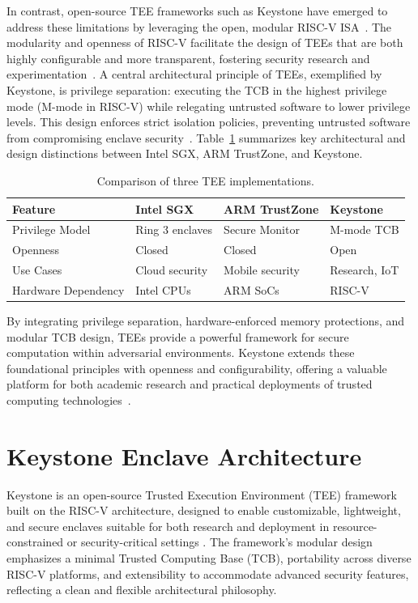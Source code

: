 In contrast, open-source TEE frameworks such as Keystone have emerged to address these limitations by leveraging the open, modular RISC-V ISA~\cite{Lee2019}. The modularity and openness of RISC-V facilitate the design of TEEs that are both highly configurable and more transparent, fostering security research and experimentation~\cite{Survey2023}. A central architectural principle of TEEs, exemplified by Keystone, is privilege separation: executing the TCB in the highest privilege mode (M-mode in RISC-V) while relegating untrusted software to lower privilege levels. This design enforces strict isolation policies, preventing untrusted software from compromising enclave security~\cite{Lee2019}.
Table~\ref{tab:tee-comparison} summarizes key architectural and design distinctions between Intel SGX, ARM TrustZone, and Keystone.

\begin{table}[htbp]
\centering
\caption{Comparison of three TEE implementations.}
\label{tab:tee-comparison}
\small
\begin{tabular}{@{}p{3cm}p{2.5cm}p{2.5cm}p{2.5cm}@{}}
\toprule
\textbf{Feature} & \textbf{Intel SGX} & \textbf{ARM TrustZone} & \textbf{Keystone} \\
\midrule
Privilege Model & Ring 3 enclaves & Secure Monitor & M-mode TCB \\
Openness & Closed & Closed & Open \\
Use Cases & Cloud security & Mobile security & Research, IoT \\
Hardware Dependency & Intel CPUs & ARM SoCs & RISC-V \\
\bottomrule
\end{tabular}
\end{table}


By integrating privilege separation, hardware-enforced memory protections, and modular TCB design, TEEs provide a powerful framework for secure computation within adversarial environments. Keystone extends these foundational principles with openness and configurability, offering a valuable platform for both academic research and practical deployments of trusted computing technologies~\cite{suzaki2021tsperf}.


\section{Keystone Enclave Architecture}

Keystone is an open-source Trusted Execution Environment (TEE) framework built on the RISC-V architecture, designed to enable customizable, lightweight, and secure enclaves suitable for both research and deployment in resource-constrained or security-critical settings \cite{Lee2019}. The framework’s modular design emphasizes a minimal Trusted Computing Base (TCB), portability across diverse RISC-V platforms, and extensibility to accommodate advanced security features, reflecting a clean and flexible architectural philosophy.

